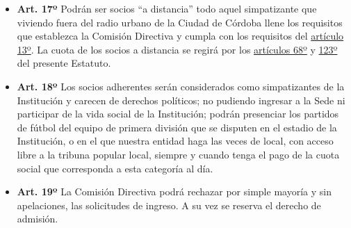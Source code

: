 \documentclass[]{book}
\providecommand{\tightlist}{%
  \setlength{\itemsep}{0pt}\setlength{\parskip}{0pt}}
\begin{document}
\begin{itemize}
\tightlist
\item
  \textbf{Art. 17º}
  Podrán ser socios ``a distancia'' todo aquel simpatizante que viviendo fuera del radio urbano de la Ciudad de Córdoba llene los requisitos que establezca la Comisión Directiva y cumpla con los requisitos del \protect\hyperlink{art13}{artículo 13º}. La cuota de los socios a distancia se regirá por los \protect\hyperlink{art68}{artículos 68º} y \protect\hyperlink{art123}{123º} del presente Estatuto.
\end{itemize}

\begin{itemize}
\tightlist
\item
  \textbf{Art. 18º}
  Los socios adherentes serán considerados como simpatizantes de la Institución y carecen de derechos políticos; no pudiendo ingresar a la Sede ni participar de la vida social de la Institución; podrán presenciar los partidos de fútbol del equipo de primera división que se disputen en el estadio de la Institución, o en el que nuestra entidad haga las veces de local, con acceso libre a la tribuna popular local, siempre y cuando tenga el pago de la cuota social que corresponda a esta categoría al día.
\end{itemize}

\begin{itemize}
\tightlist
\item
  \textbf{Art. 19º}
  La Comisión Directiva podrá rechazar por simple mayoría y sin apelaciones, las solicitudes de ingreso. A su vez se reserva el derecho de admisión.
\end{itemize}
\end{document}
